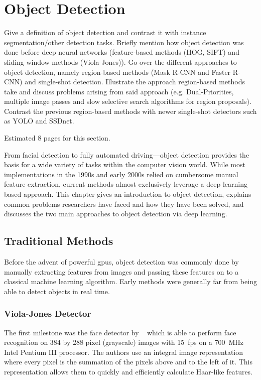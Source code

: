 \documentclass[draft,final]{vutinfth} %
\begin{document}
\section{Object Detection}
\label{sec:background-detection}

Give a definition of object detection and contrast it with instance
segmentation/other detection tasks. Briefly mention how object
detection was done before deep neural networks (feature-based methods
(HOG, SIFT) and sliding window methods (Viola-Jones)). Go over the
different approaches to object detection, namely region-based methods
(Mask R-CNN and Faster R-CNN) and single-shot detection. Illustrate
the approach region-based methods take and discuss problems arising
from said approach (e.g. Dual-Priorities, multiple image passes and
slow selective search algorithms for region proposals). Contrast the
previous region-based methods with newer single-shot detectors such as
YOLO and SSDnet. 

Estimated 8 pages for this section.

From facial detection to fully automated driving—object detection
provides the basis for a wide variety of tasks within the computer
vision world. While most implementations in the 1990s and early 2000s
relied on cumbersome manual feature extraction, current methods almost
exclusively leverage a deep learning based approach. This chapter
gives an introduction to object detection, explains common problems
researchers have faced and how they have been solved, and discusses
the two main approaches to object detection via deep learning.

\subsection{Traditional Methods}
\label{ssec:obj-traditional}

Before the advent of powerful \glspl{gpu}, object detection was
commonly done by manually extracting features from images and passing
these features on to a classical machine learning algorithm. Early
methods were generally far from being able to detect objects in real
time.

\subsubsection{Viola-Jones Detector}
\label{sssec:obj-viola-jones}

The first milestone was the face detector by
~\textcite{viola2001,viola2001} which is able to perform face
recognition on $384$ by $288$ pixel (grayscale) images with
\qty{15}{fps} on a \qty{700}{\MHz} Intel Pentium III processor. The
authors use an integral image representation where every pixel is the
summation of the pixels above and to the left of it. This
representation allows them to quickly and efficiently calculate
Haar-like features.
\end{document}
